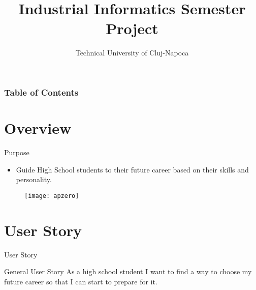 \documentclass{beamer}
\title{Industrial Informatics Semester Project}
\subtitle{Technical University of Cluj-Napoca}
\author[Technical University of Cluj-Napoca]{%
	\texorpdfstring{%
		\begin{columns}
			\column{.5\linewidth}
			\centering
			Achim Daniel \\ Băltărețu Teodor-Stelian \\ Bugnariu Vlad \\ Ciobotaru Alexandru
			\column{.5\linewidth}
			\centering
			Fildan Claudiu \\ Furdui Vasile Teodor \\ Gog Ionela-Maria
		\end{columns}
	}
	{Author 1, Author 2, Author 3}
}
\begin{document}
	\maketitle
	
    \begin{frame}
    	\frametitle{Table of Contents}
    	\tableofcontents
    \end{frame}	



\section{Overview}
\begin{frame}{Purpose}
	
	\begin{itemize}
		\item Guide High School students to their future career based on their skills and personality.
	\end{itemize}

	\begin{figure}[t]
		\texttt{[image: apzero]}
		\centering
	\end{figure}
\end{frame}

\section{User Story}
\begin{frame}{User Story}
	
	\begin{block}{General User Story}
		As a high school student I want to find a way to choose my future career
		so that I can start to prepare for it.
	\end{block}
	
\end{frame}

\end{document}
